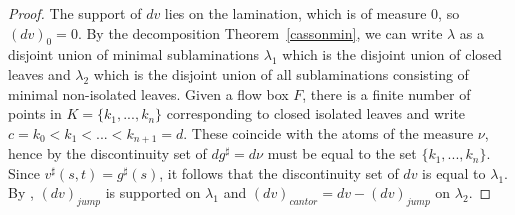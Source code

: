 \documentclass{ip-journal}
\newtheorem{theorem}{Theorem}[section]
\theoremstyle{definition}
\numberwithin{equation}{section}
\begin{document}
\begin{proof}
The support of $dv$ lies on the lamination, which is of measure 0, so 
$(dv)_0= 0$.
  By the decomposition Theorem~\ref{cassonmin}, we can write  $\lambda$
 as a disjoint union of minimal sublaminations $\lambda_1$ which is the disjoint union of  closed leaves and $\lambda_2$ which is the disjoint union of all sublaminations consisting  of minimal non-isolated leaves. Given a flow box $F$, there is a finite number of points in $K=\{k_1,...,k_n \}$ corresponding to closed isolated leaves  and write $c=k_0< k_1 <... < k_{n+1} =d$. These coincide with the atoms of the measure $\nu$, hence by \cite[Corollary 3.33]{ambrosio} the discontinuity set of $dg^\sharp=d\nu$ must be equal to the set 
 $\{ k_1,..., k_n\}$. Since $v^\sharp(s,t)=g^\sharp(s)$, it follows that the discontinuity set of $dv$ is equal to $\lambda_1$. By 
 \cite[Definition 3.91]{ambrosio}, $(dv)_{jump}$ is supported on $\lambda_1$ and $(dv)_{cantor}=dv-(dv)_{jump}$ on $\lambda_2$.
% 
%
% 
% 
%
%
%
%

\end{proof}
\end{document}
